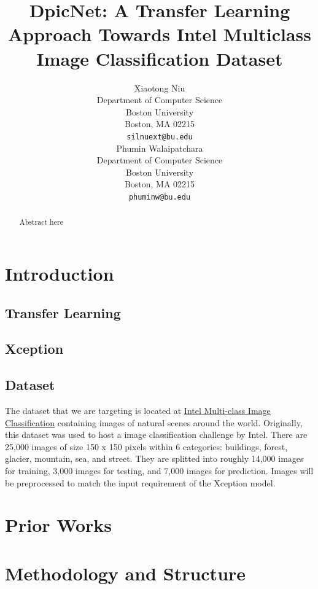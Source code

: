 \documentclass{article}
\title{DpicNet: A Transfer Learning Approach Towards Intel Multiclass Image Classification Dataset}
\author{%
  Xiaotong Niu \\
  Department of Computer Science\\
  Boston University\\
  Boston, MA 02215 \\
  \texttt{silnuext@bu.edu} \\
  \And
  Phumin Walaipatchara \\
  Department of Computer Science\\
  Boston University\\
  Boston, MA 02215 \\
  \texttt{phuminw@bu.edu} \\
}
\begin{document}
\maketitle

\begin{abstract}
  Abstract here
\end{abstract}


\section{Introduction}

\subsection{Transfer Learning}

\subsection{Xception}

\subsection{Dataset}

The dataset that we are targeting is located at \href{https://www.kaggle.com/puneet6060/intel-image-classification}{Intel Multi-class Image Classification} containing images of natural scenes around the world. Originally, this dataset was used to host a image classification challenge by Intel. There are 25,000 images of size 150 x 150 pixels within 6 categories: buildings, forest, glacier, mountain, sea, and street. They are splitted into roughly 14,000 images for training, 3,000 images for testing, and 7,000 images for prediction. Images will be preprocessed to match the input requirement of the Xception model.


\section{Prior Works}

\section{Methodology and Structure}
\end{document}
